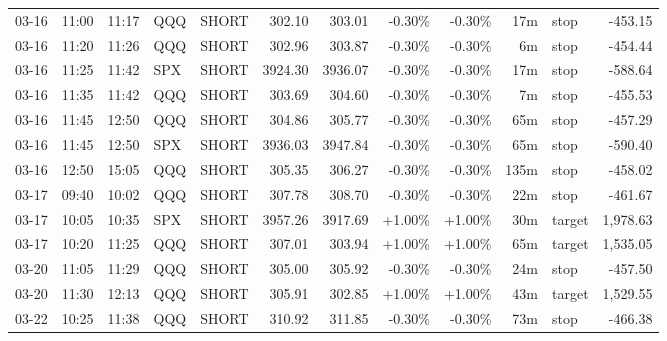 \documentclass[11pt,a4paper]{article}
\begin{document}
\begin{center}
\begin{longtable}{>{\color{txtmain}}l l l l l r r r r r >{\color{txtmain}}l r}
03-16 & 11:00 & 11:17 & QQQ & SHORT & 302.10 & 303.01 & \textcolor{lossred}{-0.30\%} & \textcolor{lossred}{-0.30\%} & 17m & stop & \textcolor{lossred}{-453.15} \\
03-16 & 11:20 & 11:26 & QQQ & SHORT & 302.96 & 303.87 & \textcolor{lossred}{-0.30\%} & \textcolor{lossred}{-0.30\%} & 6m & stop & \textcolor{lossred}{-454.44} \\
03-16 & 11:25 & 11:42 & SPX & SHORT & 3924.30 & 3936.07 & \textcolor{lossred}{-0.30\%} & \textcolor{lossred}{-0.30\%} & 17m & stop & \textcolor{lossred}{-588.64} \\
03-16 & 11:35 & 11:42 & QQQ & SHORT & 303.69 & 304.60 & \textcolor{lossred}{-0.30\%} & \textcolor{lossred}{-0.30\%} & 7m & stop & \textcolor{lossred}{-455.53} \\
03-16 & 11:45 & 12:50 & QQQ & SHORT & 304.86 & 305.77 & \textcolor{lossred}{-0.30\%} & \textcolor{lossred}{-0.30\%} & 65m & stop & \textcolor{lossred}{-457.29} \\
03-16 & 11:45 & 12:50 & SPX & SHORT & 3936.03 & 3947.84 & \textcolor{lossred}{-0.30\%} & \textcolor{lossred}{-0.30\%} & 65m & stop & \textcolor{lossred}{-590.40} \\
03-16 & 12:50 & 15:05 & QQQ & SHORT & 305.35 & 306.27 & \textcolor{lossred}{-0.30\%} & \textcolor{lossred}{-0.30\%} & 135m & stop & \textcolor{lossred}{-458.02} \\
03-17 & 09:40 & 10:02 & QQQ & SHORT & 307.78 & 308.70 & \textcolor{lossred}{-0.30\%} & \textcolor{lossred}{-0.30\%} & 22m & stop & \textcolor{lossred}{-461.67} \\
03-17 & 10:05 & 10:35 & SPX & SHORT & 3957.26 & 3917.69 & \textcolor{wingreen}{+1.00\%} & \textcolor{wingreen}{+1.00\%} & 30m & target & \textcolor{wingreen}{1,978.63} \\
03-17 & 10:20 & 11:25 & QQQ & SHORT & 307.01 & 303.94 & \textcolor{wingreen}{+1.00\%} & \textcolor{wingreen}{+1.00\%} & 65m & target & \textcolor{wingreen}{1,535.05} \\
03-20 & 11:05 & 11:29 & QQQ & SHORT & 305.00 & 305.92 & \textcolor{lossred}{-0.30\%} & \textcolor{lossred}{-0.30\%} & 24m & stop & \textcolor{lossred}{-457.50} \\
03-20 & 11:30 & 12:13 & QQQ & SHORT & 305.91 & 302.85 & \textcolor{wingreen}{+1.00\%} & \textcolor{wingreen}{+1.00\%} & 43m & target & \textcolor{wingreen}{1,529.55} \\
03-22 & 10:25 & 11:38 & QQQ & SHORT & 310.92 & 311.85 & \textcolor{lossred}{-0.30\%} & \textcolor{lossred}{-0.30\%} & 73m & stop & \textcolor{lossred}{-466.38} \\

\end{longtable}
\end{center}
\end{document}
